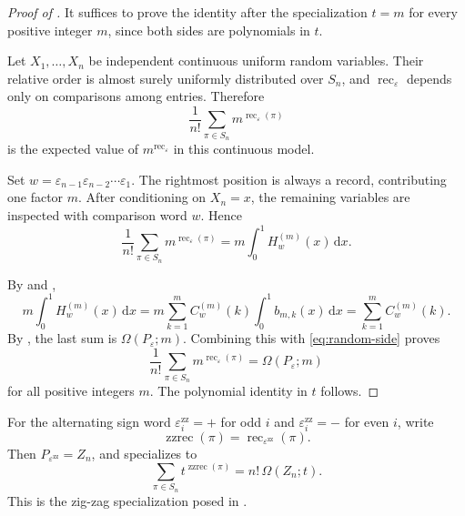 \documentclass[10pt,a4paper]{amsart}
\DeclareMathOperator{\rec}{rec}
\DeclareMathOperator{\zzrec}{zzrec}
\newcommand{\dd}{\,\mathrm{d}}
\newcommand{\eps}{\varepsilon}
\begin{document}
\begin{proof}[Proof of ]
It suffices to prove the identity after the specialization \(t=m\) for every
positive integer \(m\), since both sides are polynomials in \(t\).

Let \(X_1,\ldots,X_n\) be independent continuous uniform random variables.
Their relative order is almost surely uniformly distributed over \(S_n\), and
\(\rec_\eps\) depends only on comparisons among entries.  Therefore
\[
\frac1{n!}\sum_{\pi\in S_n}m^{\rec_\eps(\pi)}
\]
is the expected value of \(m^{\rec_\eps}\) in this continuous model.

Set $w=\eps_{n-1}\eps_{n-2}\cdots\eps_1$. The rightmost position is always a record, contributing one factor \(m\).  After
conditioning on \(X_n=x\), the remaining variables are inspected with comparison
word \(w\).  Hence
\begin{equation}\label{eq:random-side}
\frac1{n!}\sum_{\pi\in S_n}m^{\rec_\eps(\pi)}
=m\int_0^1 H_w^{(m)}(x)\dd x.
\end{equation}

By  and ,
\[
m\int_0^1 H_w^{(m)}(x)\dd x
=
m\sum_{k=1}^m C_w^{(m)}(k)\int_0^1b_{m,k}(x)\dd x
=
\sum_{k=1}^m C_w^{(m)}(k).
\]
By , the last sum is \(\Omega(P_\eps;m)\).  Combining
this with \eqref{eq:random-side} proves
\[
\frac1{n!}\sum_{\pi\in S_n}m^{\rec_\eps(\pi)}=\Omega(P_\eps;m)
\]
for all positive integers \(m\).  The polynomial identity in \(t\) follows.
\end{proof}

For the alternating sign word
\(\eps_i^{\mathrm{zz}}=+\) for odd \(i\) and
\(\eps_i^{\mathrm{zz}}=-\) for even \(i\), write
\[
\zzrec(\pi)=\rec_{\eps^{\mathrm{zz}}}(\pi).
\]
Then \(P_{\eps^{\mathrm{zz}}}=Z_n\), and  specializes
to
\[
\sum_{\pi\in S_n}t^{\zzrec(\pi)}=n!\,\Omega(Z_n;t).
\]
This is the zig-zag specialization posed in \cite[Problem~5.3]{FMP}.
\end{document}
